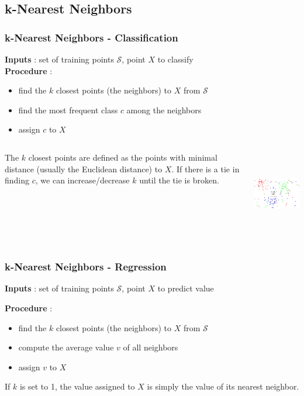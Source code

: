 \documentclass{beamer}
\begin{document}
\subsection{k-Nearest Neighbors}
\begin{frame}
  \frametitle{k-Nearest Neighbors - Classification}
  \textbf{Inputs} : set of training points $\mathcal{S}$, point $X$ to
  classify\\
  \textbf{Procedure} :
  \begin{itemize}
    \item find the $k$ closest points (the neighbors) to $X$ from $\mathcal{S}$
    \item find the most frequent class $c$ among the neighbors
    \item assign $c$ to $X$
  \end{itemize}

  \begin{columns}
      \parbox{\linewidth}{The $k$ closest points are defined as the points with
      minimal distance (usually the Euclidean distance) to $X$. If there is a
      tie in finding $c$, we can increase/decrease $k$ until the tie is broken.}

      \centering
      \includegraphics[height=3.8cm]{img/knn.png}
    \end{columns}
\end{frame}

\begin{frame}
  \frametitle{k-Nearest Neighbors - Regression}
  \textbf{Inputs} : set of training points $\mathcal{S}$, point $X$ to predict
  value

  \textbf{Procedure} :
  \begin{itemize}
    \item find the $k$ closest points (the neighbors) to $X$ from $\mathcal{S}$
    \item compute the average value $v$ of all neighbors
    \item assign $v$ to $X$
  \end{itemize}

  If $k$ is set to 1, the value assigned to $X$ is simply the value of its
  nearest neighbor.
\end{frame}
\end{document}
